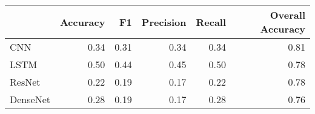 \begin{tabular}{lrrrrr}
\toprule
{} &  Accuracy &    F1 &  Precision &  Recall &  Overall Accuracy \\
\midrule
CNN      &      0.34 &  0.31 &       0.34 &    0.34 &              0.81 \\
LSTM     &      0.50 &  0.44 &       0.45 &    0.50 &              0.78 \\
ResNet   &      0.22 &  0.19 &       0.17 &    0.22 &              0.78 \\
DenseNet &      0.28 &  0.19 &       0.17 &    0.28 &              0.76 \\
\bottomrule
\end{tabular}
